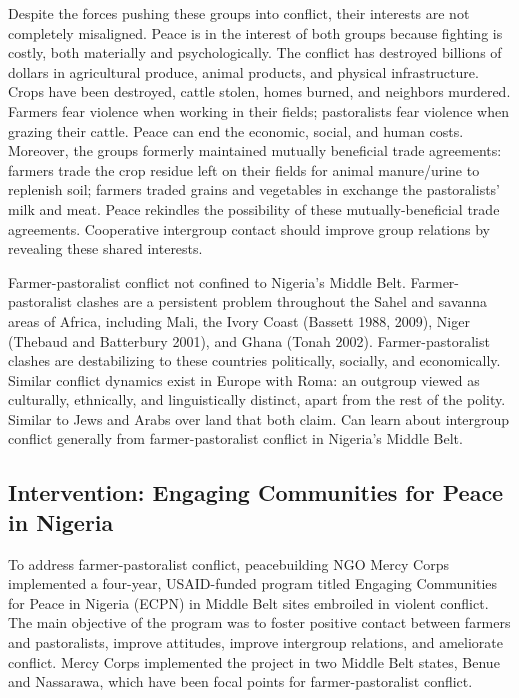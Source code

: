 \documentclass[11pt]{article}
\begin{document}
Despite the forces pushing these groups into conflict, their interests
are not completely misaligned. Peace is in the interest of both groups
because fighting is costly, both materially and psychologically. The
conflict has destroyed billions of dollars in agricultural produce,
animal products, and physical infrastructure. Crops have been destroyed,
cattle stolen, homes burned, and neighbors murdered. Farmers fear
violence when working in their fields; pastoralists fear violence when
grazing their cattle. Peace can end the economic, social, and human
costs. Moreover, the groups formerly maintained mutually beneficial
trade agreements: farmers trade the crop residue left on their fields
for animal manure/urine to replenish soil; farmers traded grains and
vegetables in exchange the pastoralists' milk and meat. Peace rekindles
the possibility of these mutually-beneficial trade agreements.
Cooperative intergroup contact should improve group relations by
revealing these shared interests.

Farmer-pastoralist conflict not confined to Nigeria's Middle Belt.
Farmer-pastoralist clashes are a persistent problem throughout the Sahel
and savanna areas of Africa, including Mali, the Ivory Coast (Bassett
1988, 2009), Niger (Thebaud and Batterbury 2001), and Ghana (Tonah
2002). Farmer-pastoralist clashes are destabilizing to these countries
politically, socially, and economically. Similar conflict dynamics exist
in Europe with Roma: an outgroup viewed as culturally, ethnically, and
linguistically distinct, apart from the rest of the polity. Similar to
Jews and Arabs over land that both claim. Can learn about intergroup
conflict generally from farmer-pastoralist conflict in Nigeria's Middle
Belt.

\hypertarget{intervention-engaging-communities-for-peace-in-nigeria}{%
\subsection{Intervention: Engaging Communities for Peace in
Nigeria}\label{intervention-engaging-communities-for-peace-in-nigeria}}

To address farmer-pastoralist conflict, peacebuilding NGO Mercy Corps
implemented a four-year, USAID-funded program titled Engaging
Communities for Peace in Nigeria (ECPN) in Middle Belt sites embroiled
in violent conflict. The main objective of the program was to foster
positive contact between farmers and pastoralists, improve attitudes,
improve intergroup relations, and ameliorate conflict. Mercy Corps
implemented the project in two Middle Belt states, Benue and Nassarawa,
which have been focal points for farmer-pastoralist conflict.
\end{document}
